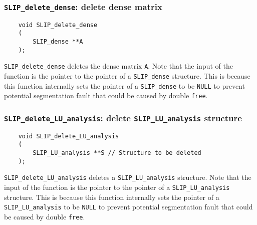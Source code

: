 \documentclass[12pt]{article}
\theoremstyle{definition}
\begin{document}
\cprotect\subsubsection{\verb|SLIP_delete_dense|: delete dense matrix}
\label{ss:delete_dense}

\begin{mdframed}[userdefinedwidth=6in]
{\footnotesize
\begin{verbatim}
    void SLIP_delete_dense
    (
        SLIP_dense **A
    );
\end{verbatim}
} \end{mdframed}

\verb|SLIP_delete_dense| deletes the dense matrix \verb|A|. Note that the input
of the function is the pointer to the pointer of a \verb|SLIP_dense| structure.
This is because this function internally sets the pointer of a
\verb|SLIP_dense| to be \verb|NULL| to prevent potential segmentation fault
that could be caused by double \verb|free|.

\cprotect\subsubsection{\verb|SLIP_delete_LU_analysis|: delete \verb|SLIP_LU_analysis| structure}
\label{ss:delete_LU_analysis}

\begin{mdframed}[userdefinedwidth=6in]
{\footnotesize
\begin{verbatim}
    void SLIP_delete_LU_analysis
    (
        SLIP_LU_analysis **S // Structure to be deleted
    );
\end{verbatim}
} \end{mdframed}


\verb|SLIP_delete_LU_analysis| deletes a \verb|SLIP_LU_analysis| structure.
Note that the input of the function is the pointer to the pointer of a
\verb|SLIP_LU_analysis| structure. This is because this function internally
sets the pointer of a \verb|SLIP_LU_analysis| to be \verb|NULL| to prevent
potential segmentation fault that could be caused by double \verb|free|.

\end{document}
